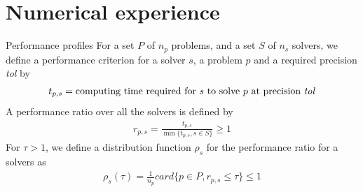 \documentclass[8pt,red]{beamer}
\theoremstyle{plain}
\theoremstyle{definition}
\theoremstyle{remark}
\begin{document}
\section{Numerical experience}


\begin{frame}{Performance profiles}
For a set $P$ of $n_{p}$ problems, and a set $S$ of $n_{s}$ solvers, we define a performance criterion for a solver $s$, a problem $p$ and a required precision \textit{tol} by
\begin{align}
	t_{p,s} = \text{computing time required for } s \text{ to solve } p \text{ at precision \textit{tol}}
\end{align}
A performance ratio over all the solvers is defined by
\begin{align}
	r_{p,s} = \frac{t_{p,s}}{\min \lbrace t_{p,s}, s \in S \rbrace} \geq 1
\end{align}
For $\tau > 1$, we define a distribution function $\rho_{s}$ for the performance ratio for a solvers as
\begin{align}
	\rho_{s}(\tau) = \frac{1}{n_{p}} card \lbrace p \in P, r_{p,s} \leq \tau \rbrace \leq 1
\end{align}
\end{frame}
\end{document}
